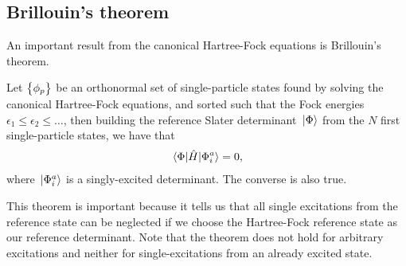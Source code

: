         \subsection{Brillouin's theorem}
            An important result from the canonical Hartree-Fock equations is
            Brillouin's theorem.
            \begin{theorem}
                \label{theorem:brillouin}
                Let $\left\{ \phi_p \right\}$ be an orthonormal set of single-particle
                states found by solving the canonical Hartree-Fock equations,
                and sorted such that the Fock energies $\epsilon_1 \leq
                \epsilon_2 \leq \dots$, then building the reference Slater
                determinant $\ket*{\Phi}$ from the $N$ first single-particle
                states, we have that
                \begin{align}
                    \mel*{\Phi}{\hat{H}}{\Phi^{a}_{i}} = 0,
                \end{align}
                where $\ket*{\Phi^{a}_{i}}$ is a singly-excited determinant.
                The converse is also true.
            \end{theorem}
            This theorem is important because it tells us that all single
            excitations from the reference state can be neglected if we choose
            the Hartree-Fock reference state as our reference determinant.
            Note that the theorem does not hold for arbitrary excitations and
            neither for single-excitations from an already excited state.
